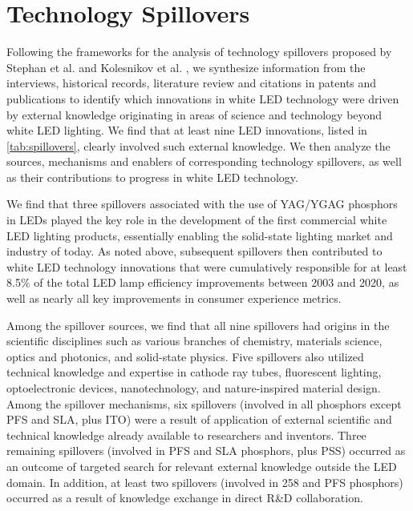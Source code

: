 \documentclass[parskip=full]{article}
\begin{document}
\clearpage
\section{Technology Spillovers}

Following the frameworks for the analysis of technology spillovers proposed by Stephan et al. \cite{Stephan2021} and Kolesnikov et al. \cite{kolesnikov2022technology}, we synthesize information from the interviews, historical records, literature review and citations in patents and publications to identify which innovations in white LED technology were driven by external knowledge originating in areas of science and technology beyond white LED lighting. We find that at least nine LED innovations, listed in \cref{tab:spillovers}, clearly involved such external knowledge. We then analyze the sources, mechanisms and enablers of corresponding technology spillovers, as well as their contributions to progress in white LED technology. 

We find that three spillovers associated with the use of YAG/YGAG phosphors in LEDs played the key role in the development of the first commercial white LED lighting products, essentially enabling the solid-state lighting market and industry of today. As noted above, subsequent spillovers then contributed to white LED technology innovations that were cumulatively responsible for at least 8.5\% of the total LED lamp efficiency improvements between 2003 and 2020, as well as nearly all key improvements in consumer experience metrics.

Among the spillover sources, we find that all nine spillovers had origins in the scientific disciplines such as various branches of chemistry, materials science, optics and photonics, and solid-state physics. Five spillovers also utilized technical knowledge and expertise in cathode ray tubes, fluorescent lighting, optoelectronic devices, nanotechnology, and nature-inspired material design.
Among the spillover mechanisms, six spillovers (involved in all phosphors except PFS and SLA, plus ITO) were a result of application of external scientific and technical knowledge already available to researchers and inventors. Three remaining spillovers (involved in PFS and SLA phosphors, plus PSS) occurred as an outcome of targeted search for relevant external knowledge outside the LED domain. In addition, at least two spillovers (involved in 258 and PFS phosphors) occurred as a result of knowledge exchange in direct R\&D collaboration.
\end{document}
